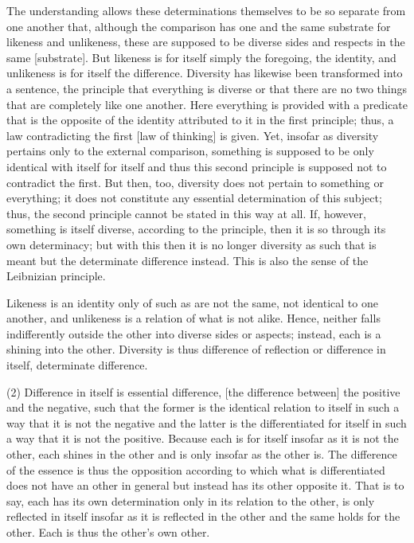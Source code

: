     The understanding allows these determinations themselves to be
    so separate from one another that, although the comparison has one
    and the same substrate for likeness and unlikeness, these are
    supposed to be diverse sides and respects in the same [substrate].
    But likeness is for itself simply the foregoing, the identity,
    and unlikeness is for itself the difference.
    Diversity has likewise been transformed into a sentence,
    the principle that everything is diverse or
    that there are no two things that are completely like one another.
    Here everything is provided with a predicate
    that is the opposite of the identity attributed to it
    in the first principle;
    thus, a law contradicting the first [law of thinking] is given.
    Yet, insofar as diversity pertains only to the external comparison,
    something is supposed to be only identical with itself for itself
    and thus this second principle is supposed not to contradict the first.
    But then, too, diversity does not pertain to something or everything;
    it does not constitute any essential determination of this subject;
    thus, the second principle cannot be stated in this way at all.
    If, however, something is itself diverse, according to the principle,
    then it is so through its own determinacy;
    but with this then it is no longer diversity as such that is meant
    but the determinate difference instead.
    This is also the sense of the Leibnizian principle.

Likeness is an identity only of such as are
not the same, not identical to one another, and
unlikeness is a relation of what is not alike.
Hence, neither falls indifferently outside the other
into diverse sides or aspects;
instead, each is a shining into the other.
Diversity is thus difference of reflection or
difference in itself, determinate difference.

(2) Difference in itself is essential difference,
[the difference between] the positive and the negative,
such that the former is the identical relation to itself
in such a way that it is not the negative and
the latter is the differentiated for itself
in such a way that it is not the positive.
Because each is for itself insofar as it is not the other,
each shines in the other and is only insofar as the other is.
The difference of the essence is thus the opposition
according to which what is differentiated does not have
an other in general but instead has its other opposite it.
That is to say, each has its own determination
only in its relation to the other,
is only reflected in itself insofar as
it is reflected in the other
and the same holds for the other.
Each is thus the other's own other.


